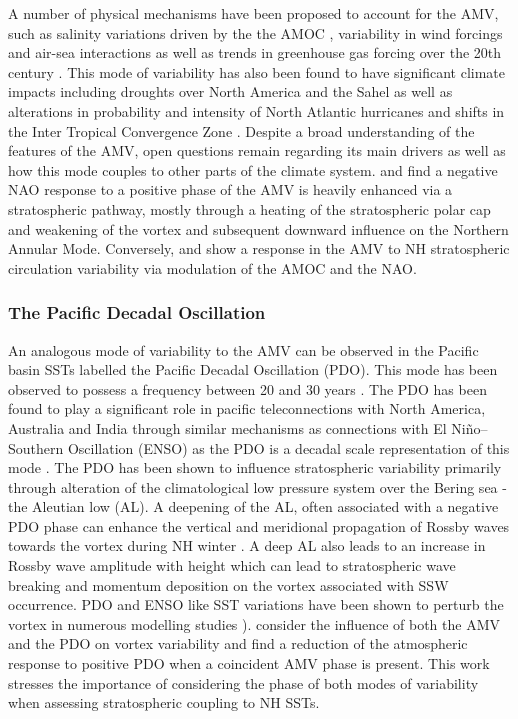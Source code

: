 A number of physical mechanisms have been proposed to account for the AMV, such as salinity variations driven by the the AMOC \citep{Kuhlbrodt2007}, variability in wind forcings and air-sea interactions \citep{Medhaug2011} as well as trends in greenhouse gas forcing over the 20th century \citep{Ottera2010,Booth2012,Knudsen2014}. This mode of variability has also been found to have significant climate impacts including droughts over North America and the Sahel as well as alterations in probability and intensity of North Atlantic hurricanes and shifts in the Inter Tropical Convergence Zone \citep{Zhang2006,Ting2011,Nigam2011}. Despite a broad understanding of the features of the AMV, open questions remain regarding its main drivers as well as how this mode couples to other parts of the climate system. \cite{Peings2016} and \cite{Omrani2014} find a negative NAO response to a positive phase of the AMV is heavily enhanced via a stratospheric pathway, mostly through a heating of the stratospheric polar cap and weakening of the vortex and subsequent downward influence on the Northern Annular Mode. Conversely, \cite{Reichler2012} and \cite{manziniStratospheretroposphere2012} show a response in the AMV to NH stratospheric circulation variability via modulation of the AMOC and the NAO. 

\subsubsection*{The Pacific Decadal Oscillation }
An analogous mode of variability to the AMV can be observed in the Pacific basin SSTs \citep{Mantua1997,Dong2015} labelled the Pacific Decadal Oscillation (PDO). This mode has been observed to possess a frequency between 20 and 30 years \citep{Henley2015}. The PDO has been found to play a significant role in pacific teleconnections with North America, Australia and India through similar mechanisms as connections with El Niño–Southern Oscillation (ENSO) as the PDO is a decadal scale representation of this mode \citep{Horel1981,Bahaga2019}. The PDO has been shown to influence stratospheric variability primarily through alteration of the climatological low pressure system over the Bering sea - the Aleutian low (AL). A deepening of the AL, often associated with a negative PDO phase can enhance the vertical and meridional propagation of Rossby waves towards the vortex during NH winter \citep{krenWintertime2016,Kang2017,huDecadal2018}. A deep AL also leads to an increase in Rossby wave amplitude with height \citep{Plumb2003} which can lead to stratospheric wave breaking and momentum deposition on the vortex associated with SSW occurrence. PDO and ENSO like SST variations have been shown to perturb the vortex in numerous modelling studies \citep{krenWintertime2016,Garcia-Herrera2006}). \cite{Elsbury2019} consider the influence of both the AMV and the PDO on vortex variability and find a reduction of the atmospheric response to positive PDO when a coincident AMV phase is present. This work stresses the importance of considering the phase of both modes of variability when assessing stratospheric coupling to NH SSTs. 

